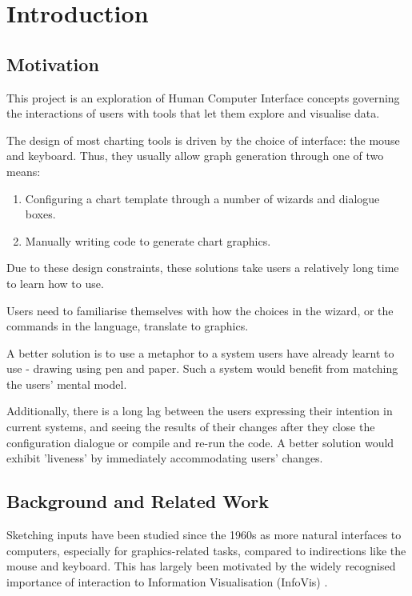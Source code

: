 \chapter{Introduction}
\label{cha:introduction}
\section{Motivation}
This project is an exploration of Human Computer Interface concepts governing the interactions of users with tools that let them explore and visualise data.

The design of most charting tools is driven by the choice of interface: the mouse and keyboard. Thus, they usually allow graph generation through one of two means:
\begin{enumerate}
\item Configuring a chart template through a number of wizards and dialogue boxes.
\item Manually writing code to generate chart graphics.
\end{enumerate}

Due to these design constraints, these solutions take users a relatively long time to learn how to use. 

Users need to familiarise themselves with how the choices in the wizard, or the commands in the language, translate to graphics.

A better solution is to use a metaphor to a system users have already learnt to use - drawing using pen and paper. Such a system would benefit from matching the users' mental model. 

Additionally, there is a long lag between the users expressing their intention in current systems, and seeing the results of their changes after they close the configuration dialogue or compile and re-run the code. A better solution would exhibit 'liveness' by immediately accommodating users' changes.

\section{Background and Related Work}
Sketching inputs have been studied since the 1960s \citep{sutherland_sketch_1964} as more natural interfaces to computers, especially for graphics-related tasks, compared to indirections like the mouse and keyboard. This has largely been motivated by the widely recognised importance of interaction to Information Visualisation (InfoVis) \citep{lee_beyond_2012}. 

